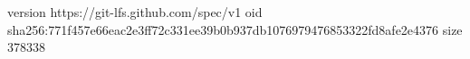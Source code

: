 version https://git-lfs.github.com/spec/v1
oid sha256:771f457e66eac2e3ff72c331ee39b0b937db1076979476853322fd8afe2e4376
size 378338
